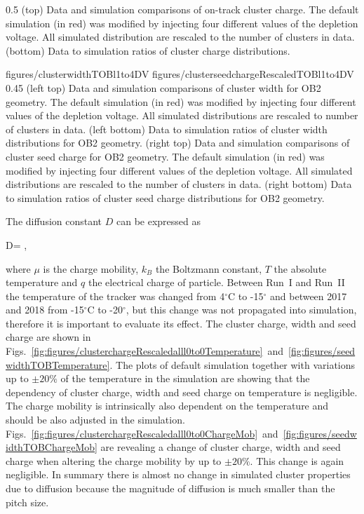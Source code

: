                  {0.5}       %
                 { (top) Data and simulation comparisons of on-track cluster charge. The default simulation (in red) was modified by injecting four different values of the depletion voltage. All simulated distribution are rescaled to the number of clusters in data. (bottom) Data to simulation ratios of cluster charge distributions. }

                 {figures/clusterwidthTOBl1to4DV}
                 {figures/clusterseedchargeRescaledTOBl1to4DV} %
                 {0.45}       %
                 {(left top) Data and simulation  comparisons of cluster width for OB2 geometry. The default simulation (in red) was modified by injecting four different values of the depletion voltage. All simulated distributions are rescaled to number of clusters in data. (left bottom) Data to simulation ratios of cluster width distributions for OB2 geometry. (right top) Data and simulation  comparisons of cluster seed charge for OB2 geometry. The default simulation (in red) was modified by injecting four different values of the depletion voltage. All simulated distributions are rescaled to the number of clusters in data. (right bottom) Data to simulation ratios of cluster seed charge distributions for OB2 geometry. }

The diffusion constant $D$ can be expressed as

{
   D=  ,
}

where $\mu$ is the charge mobility, $k_{B}$ the Boltzmann constant, $T$ the absolute temperature and $q$ the electrical charge of particle. Between Run~I and Run~II the temperature of the tracker was changed from 4$^{\circ}$C to -15$^{\circ}$ and between 2017 and 2018 from -15$^{\circ}$C to -20$^{\circ}$, but this change was not propagated into simulation, therefore it is important to evaluate its effect. The cluster charge, width and seed charge are shown in Figs.~\ref{fig:figures/clusterchargeRescaledalll0to0Temperature}~and~\ref{fig:figures/seedwidthTOBTemperature}. The plots of default simulation together with variations up to $\pm 20\%$ of the temperature in the simulation are showing that the dependency of cluster charge, width and seed charge on temperature is negligible. The charge mobility is intrinsically also dependent on the temperature and should be also adjusted in the simulation. Figs.~\ref{fig:figures/clusterchargeRescaledalll0to0ChargeMob}~and~\ref{fig:figures/seedwidthTOBChargeMob} are revealing a change of cluster charge, width and seed charge when altering the charge mobility by up to $\pm 20\%$. This change is again negligible. In summary there is almost no change in simulated cluster properties due to diffusion because the magnitude of diffusion is much smaller than the pitch size.


